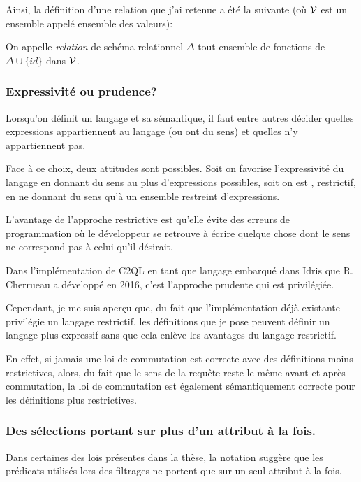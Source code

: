 Ainsi, la définition d'une relation que j'ai retenue a été la suivante
(où $\mathcal{V}$ est un ensemble appelé ensemble des valeurs):

\begin{defi*}
	On appelle \emph{relation} de schéma relationnel $\Delta$
	tout ensemble de fonctions de $\Delta \cup \{ id \}$ dans $\mathcal{V}$.
\end{defi*}

\subsubsection*{Expressivité ou prudence?}
Lorsqu'on définit un langage et sa sémantique, il faut entre autres
décider quelles expressions appartiennent au langage
(ou \og ont du sens\fg{}) et quelles n'y appartiennent pas.

Face à ce choix, deux attitudes sont possibles.
Soit on favorise l'expressivité du langage en donnant du sens
au plus d'expressions possibles, soit on est , restrictif,
en ne donnant du sens qu'à un ensemble restreint d'expressions.

L'avantage de l'approche restrictive est qu'elle évite des erreurs de programmation
où le développeur se retrouve à écrire quelque chose dont le sens
ne correspond pas à celui qu'il désirait.

Dans l'implémentation de C2QL en tant que langage embarqué dans Idris
que R. Cherrueau a développé en 2016, c'est l'approche
\og prudente \fg{} qui est privilégiée.

Cependant, je me suis aperçu que, du fait que l'implémentation
déjà existante privilégie un langage restrictif,
les définitions que je pose peuvent définir un langage plus
expressif sans que cela enlève
les avantages du langage restrictif.

En effet, si jamais une loi de commutation est correcte avec des définitions
moins restrictives, alors, du fait que le sens de la requête reste le même avant et après
commutation, la loi de commutation est également sémantiquement correcte pour
les définitions plus restrictives.

\subsubsection*{Des sélections portant sur plus d'un attribut à la fois.}
Dans certaines des lois présentes dans la thèse, la notation
suggère que les prédicats utilisés lors des filtrages ne portent que sur
un seul attribut à la fois.

